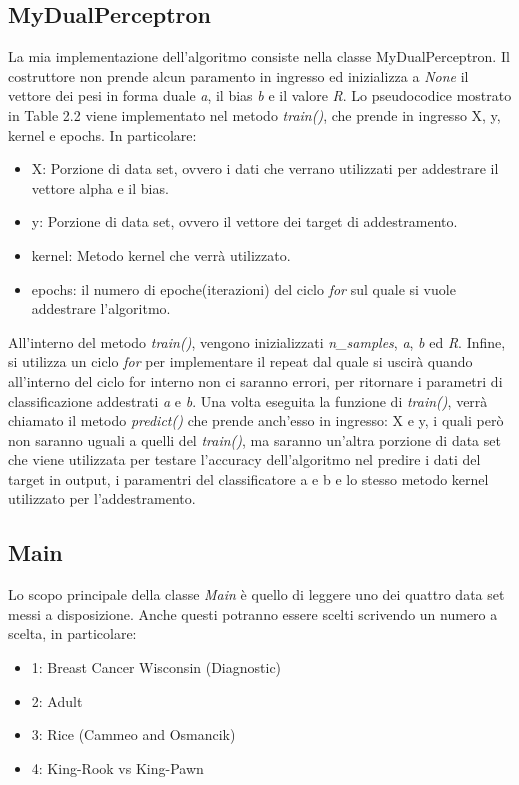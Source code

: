 \documentclass{article}
\begin{document}
    \subsection{MyDualPerceptron}
    La mia implementazione dell'algoritmo consiste nella classe MyDualPerceptron. 
	Il costruttore non prende alcun paramento in ingresso ed inizializza a \textit{None} il vettore dei pesi in forma duale \textit{a}, il bias \textit{b} 
	e il valore \textit{R}. Lo pseudocodice mostrato in Table 2.2 viene implementato nel metodo \textit{train()}, 
	che prende in ingresso X, y, kernel e epochs. In particolare:
    \begin{itemize}
    	\item X: Porzione di data set, ovvero i dati che verrano utilizzati per addestrare il vettore alpha e il bias.
    	\item y: Porzione di data set, ovvero il vettore dei target di addestramento.
    	\item kernel: Metodo kernel che verrà utilizzato.
    	\item epochs: il numero di epoche(iterazioni) del ciclo \textit{for} sul quale si vuole addestrare l'algoritmo.
    \end{itemize}
	All'interno del metodo \textit{train()}, vengono inizializzati \textit{n\_samples}, \textit{a}, \textit{b} ed \textit{R}. Infine, si utilizza un ciclo \textit{for} per implementare il repeat dal quale si uscirà quando all'interno del ciclo for interno non ci saranno errori, per ritornare i parametri di classificazione addestrati \textit{a} e \textit{b}.
    Una volta eseguita la funzione di \textit{train()}, verrà chiamato il metodo \textit{predict()} che prende anch'esso in ingresso: X e y, i quali però non saranno uguali a quelli del \textit{train()}, ma saranno un'altra porzione di data set che viene utilizzata per testare l'accuracy dell'algoritmo nel predire i dati del target in output, i paramentri del classificatore {a} e {b} e lo stesso metodo kernel utilizzato per l'addestramento.
    \subsection{Main}
	Lo scopo principale della classe \textit{Main} è quello di leggere uno dei quattro data set messi a disposizione. 
	Anche questi potranno essere scelti scrivendo un numero a scelta, in particolare:
	\begin{itemize}
		\item 1: Breast Cancer Wisconsin (Diagnostic)
		\item 2: Adult
		\item 3: Rice (Cammeo and Osmancik)
		\item 4: King-Rook vs King-Pawn
	\end{itemize}
\end{document}
